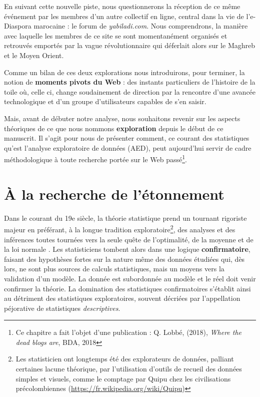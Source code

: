 \documentclass[symmetric,justified,marginals=raggedouter]{tufte-book}
\begin{document}
En suivant cette nouvelle piste, nous questionnerons la réception de ce même événement par les membres d'un autre collectif en ligne, central dans la vie de l'e-Diaspora marocaine : le forum de \textit{yabiladi.com}. Nous comprendrons, la manière avec laquelle les membres de ce site se sont momentanément organisés et retrouvés emportés par la vague révolutionnaire qui déferlait alors sur le Maghreb et le Moyen Orient. 

Comme un bilan de ces deux explorations nous introduirons, pour terminer, la notion de \textbf{moments pivots du Web} : des instants particuliers de l'histoire de la toile où, celle ci, change soudainement de direction par la rencontre d'une avancée technologique et d'un groupe d'utilisateurs capables de s'en saisir.

Mais, avant de débuter notre analyse, nous souhaitons revenir sur les aspects théoriques de ce que nous nommons \textbf{exploration} depuis le début de ce manuscrit. Il s'agit pour nous de présenter comment, ce courant des statistiques qu'est l'analyse exploratoire de données (AED), peut aujourd'hui servir de cadre méthodologique à toute re\-cherche portée sur le Web passé\footnote{Ce chapitre a fait l'objet d'une publication : Q. Lobbé, (2018), \textit{Where the dead blogs are}, BDA, 2018}.\\

\section{À la recherche de l'étonnement}
\label{sec:6_eda}

\noindent Dans le courant du 19e siècle, la théorie statistique prend un tournant rigoriste majeur en préférant, à la longue tradition exploratoire\footnote{Les statisticien ont longtemps été des explorateurs de données, palliant certaines lacune théorique, par l'utilisation d'outils de recueil des données simples et visuels, comme le comptage par Quipu chez les civilisations précolombiennes (\url{https://fr.wikipedia.org/wiki/Quipu})}, des analyses et des inférences toutes tournées vers la seule quête de l'optimalité, de la moyenne et de la loi normale \citep{ladiray_laed_1997}. Les statisticiens tombent alors dans une logique \textbf{confirmatoire}, faisant des hypothèses fortes sur la nature même des données étudiées qui, dès lors, ne sont plus sources de calculs statistiques, mais un moyens vers la validation d'un modèle. La donnée est subordonnée au modèle et le réel doit venir confirmer la théorie. La domination des statistiques confirmatoires s'établit ainsi au détriment des statistiques exploratoires, souvent décriées par l'appellation péjorative de statistiques \textit{descriptives}.
\end{document}
